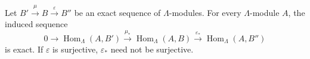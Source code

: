 Let $B' \xrightarrow{\mu} B \xrightarrow{\varepsilon} B''$ be an exact sequence of $\Lambda$-modules. For every $\Lambda$-module $A$, the induced sequence
$$0 \longrightarrow \operatorname{Hom}_\Lambda(A, B') \xrightarrow{\mu_*} \operatorname{Hom}_\Lambda(A, B) \xrightarrow{\varepsilon_*} \operatorname{Hom}_\Lambda(A, B'')$$
is exact. If $\varepsilon$ is surjective, $\varepsilon_*$ need not be surjective.